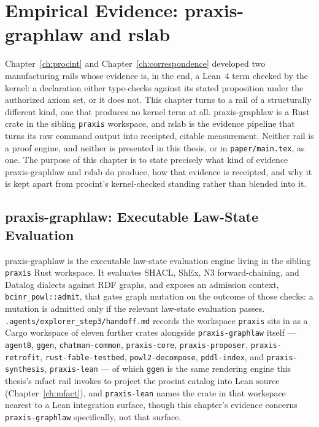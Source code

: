 \chapter{Empirical Evidence: praxis-graphlaw and rslab}
\label{ch:empirical}

Chapter~\ref{ch:procint} and Chapter~\ref{ch:correspondence} developed
two manufacturing rails whose evidence is, in the end, a Lean~4 term
checked by the kernel: a declaration either type-checks against its
stated proposition under the authorized axiom set, or it does not. This
chapter turns to a rail of a structurally different kind, one that
produces no kernel term at all. praxis-graphlaw is a Rust crate in the
sibling \texttt{praxis} workspace, and rslab is the evidence pipeline
that turns its raw command output into receipted, citable measurement.
Neither rail is a proof engine, and neither is presented in this thesis,
or in \texttt{paper/main.tex}, as one. The purpose of this chapter is to
state precisely what kind of evidence praxis-graphlaw and rslab do
produce, how that evidence is receipted, and why it is kept apart from
\textsf{procint}'s kernel-checked standing rather than blended into it.

\section{praxis-graphlaw: Executable Law-State Evaluation}
\label{sec:emp-praxis-graphlaw}

praxis-graphlaw is the executable law-state evaluation engine living in
the sibling \texttt{praxis} Rust workspace. It evaluates SHACL, ShEx, N3
forward-chaining, and Datalog dialects against RDF graphs, and exposes an
admission context, \texttt{bcinr\_powl::admit}, that gates graph mutation
on the outcome of those checks: a mutation is admitted only if the
relevant law-state evaluation passes. \texttt{.agents/explorer\_step3/handoff.md}
records the workspace \texttt{praxis} sits in as a Cargo workspace of
eleven further crates alongside \texttt{praxis-graphlaw} itself ---
\texttt{agent8}, \texttt{ggen}, \texttt{chatman-common},
\texttt{praxis-core}, \texttt{praxis-proposer}, \texttt{praxis-retrofit},
\texttt{rust-fable-testbed}, \texttt{powl2-decompose},
\texttt{pddl-index}, and \texttt{praxis-synthesis},
\texttt{praxis-lean} --- of which \texttt{ggen} is the same rendering
engine this thesis's \textsf{mfact} rail invokes to project the
\textsf{procint} catalog into Lean source (Chapter~\ref{ch:mfact}), and
\texttt{praxis-lean} names the crate in that workspace nearest to a Lean
integration surface, though this chapter's evidence concerns
\texttt{praxis-graphlaw} specifically, not that surface.

